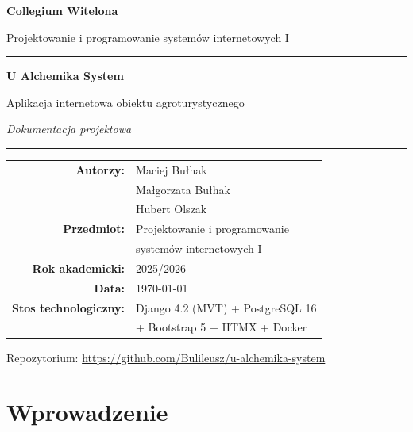 \documentclass[12pt,a4paper]{article}
\begin{document}
\begin{titlepage}
  \centering
  \vspace*{1.5cm}
  {\LARGE\bfseries Collegium Witelona \par}
  \vspace{0.5cm}
  {\large Projektowanie i programowanie systemów internetowych I \par}
  \vspace{2.5cm}

  \rule{\linewidth}{0.5mm}
  \vspace{0.6cm}
  {\Huge\bfseries U Alchemika System \par}
  \vspace{0.4cm}
  {\Large Aplikacja internetowa obiektu agroturystycznego \par}
  \vspace{0.4cm}
  {\large\itshape Dokumentacja projektowa \par}
  \rule{\linewidth}{0.5mm}

  \vspace{2cm}
  \begin{tabular}{rl}
    \textbf{Autorzy:}        & Maciej Bułhak \\[4pt]
                             & Małgorzata Bułhak \\[4pt]
                             & Hubert Olszak \\[4pt]
    \textbf{Przedmiot:}      & Projektowanie i programowanie \\
                             & systemów internetowych I \\[4pt]
    \textbf{Rok akademicki:} & 2025/2026 \\[4pt]
    \textbf{Data:}           & \today \\[4pt]
    \textbf{Stos technologiczny:} & Django 4.2 (MVT) + PostgreSQL 16 \\
                             & + Bootstrap 5 + HTMX + Docker \\
  \end{tabular}

  \vfill
  {\small Repozytorium: \url{https://github.com/Bulileusz/u-alchemika-system} \par}
\end{titlepage}

\tableofcontents
\newpage

\section{Wprowadzenie}
\end{document}
